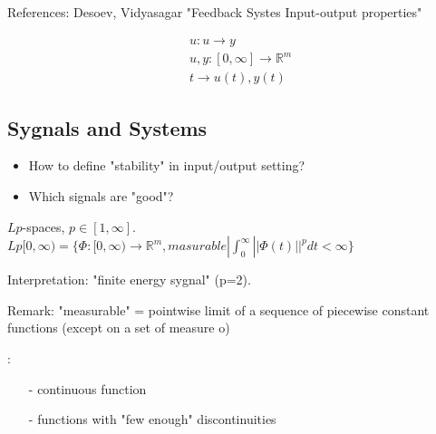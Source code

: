 References: Desoev, Vidyasagar "Feedback Systes Input-output properties"


\begin{equation*}
\begin{split}
&u: u\rightarrow y \\
&u,y:[0,\infty]\rightarrow \mathbb{R}^m \\
&t \rightarrow u(t), y(t)
\end{split}
\end{equation*}

\subsection{Sygnals and Systems}

\begin{itemize}
\item How to define "stability" in input/output setting?
\item Which signals are "good"?
\end{itemize}

\begin{Definition}
 $Lp$-spaces, $p\in[1,\infty]$. 
 $Lp[0,\infty) = \{\Phi:[0,\infty)\rightarrow\mathbb{R}^m, masurable|
  \int_0^\infty ||\Phi(t)||^p dt < \infty\}$
\end{Definition}

Interpretation: "finite energy sygnal" (p=2).

Remark: "measurable" = pointwise limit of a sequence of piecewise constant functions
(except on a set of measure o)

\begin{Example}:

\begin{itemize}
 \item[-] continuous function
 \item[-] functions with "few enough" discontinuities
\end{itemize}
\end{Example}


